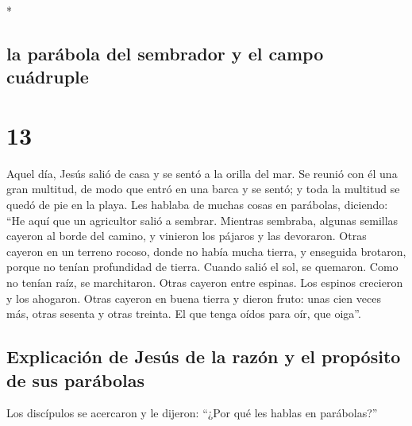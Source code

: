 \begin{paracol}{2}
\begin{otherlanguage}{english}
\end{otherlanguage}

\switchcolumn[0]*

\hypertarget{la-paruxe1bola-del-sembrador-y-el-campo-cuuxe1druple}{%
\subsection{la parábola del sembrador y el campo
cuádruple}\label{la-paruxe1bola-del-sembrador-y-el-campo-cuuxe1druple}}

\hypertarget{section-24}{%
\section{13}\label{section-24}}

 Aquel día, Jesús salió de casa y se sentó a la orilla del
mar.  Se reunió con él una gran multitud, de modo que
entró en una barca y se sentó; y toda la multitud se quedó de pie en la
playa.  Les hablaba de muchas cosas en parábolas,
diciendo: ``He aquí que un agricultor salió a sembrar. 
Mientras sembraba, algunas semillas cayeron al borde del camino, y
vinieron los pájaros y las devoraron.  Otras cayeron en un
terreno rocoso, donde no había mucha tierra, y enseguida brotaron,
porque no tenían profundidad de tierra.  Cuando salió el
sol, se quemaron. Como no tenían raíz, se marchitaron. 
Otras cayeron entre espinas. Los espinos crecieron y los ahogaron.
 Otras cayeron en buena tierra y dieron fruto: unas cien
veces más, otras sesenta y otras treinta.  El que tenga
oídos para oír, que oiga''.

\hypertarget{explicaciuxf3n-de-jesuxfas-de-la-razuxf3n-y-el-propuxf3sito-de-sus-paruxe1bolas}{%
\subsection{Explicación de Jesús de la razón y el propósito de sus
parábolas}\label{explicaciuxf3n-de-jesuxfas-de-la-razuxf3n-y-el-propuxf3sito-de-sus-paruxe1bolas}}

 Los discípulos se acercaron y le dijeron: ``¿Por qué les
hablas en parábolas?''


\end{paracol}
